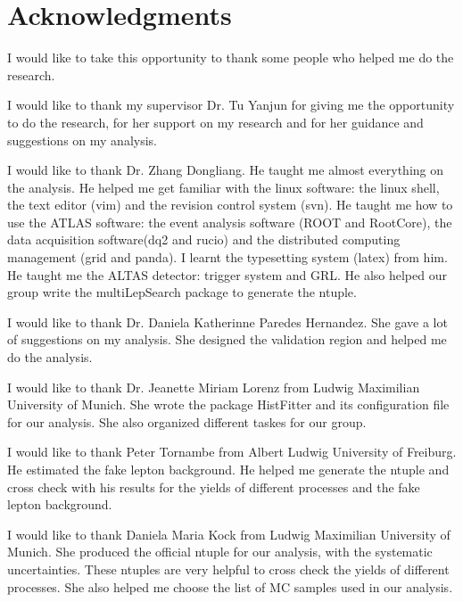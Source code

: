 
\chapter*{Acknowledgments}

I would like to take this opportunity to thank some people who helped me do the research.

I would like to thank my supervisor Dr. Tu Yanjun for giving me the opportunity to do the research, for her support on my research and for her guidance and suggestions on my analysis.

I would like to thank Dr. Zhang Dongliang.
He taught me almost everything on the analysis.
He helped me get familiar with the linux software: the linux shell, the text editor (vim) and the revision control system (svn).
He taught me how to use the ATLAS software: the event analysis software (ROOT and RootCore), the data acquisition software(dq2 and rucio) and the distributed computing management (grid and panda).
I learnt the typesetting system (latex) from him.
He taught me the ALTAS detector: trigger system and GRL.
He also helped our group write the multiLepSearch package to generate the ntuple.

I would like to thank Dr. Daniela Katherinne Paredes Hernandez.
She gave a lot of suggestions on my analysis.
She designed the validation region and helped me do the analysis.

I would like to thank Dr. Jeanette Miriam Lorenz from Ludwig Maximilian University of Munich.
She wrote the package HistFitter and its configuration file for our analysis.
She also organized different taskes for our group.

I would like to thank Peter Tornambe from Albert Ludwig University of Freiburg.
He estimated the fake lepton background.
He helped me generate the ntuple and cross check with his results for the yields of different processes and the fake lepton background.

I would like to thank Daniela Maria Kock from Ludwig Maximilian University of Munich.
She produced the official ntuple for our analysis, with the systematic uncertainties.
These ntuples are very helpful to cross check the yields of different processes.
She also helped me choose the list of MC samples used in our analysis.

